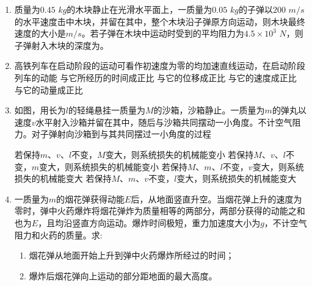\begin{enumerate}[leftmargin=0em]
{}




\item 
{}
质量为$ 0.45 $ $ kg $的木块静止在光滑水平面上，一质量为$ 0.05 $ $ kg $的子弹以$ 200 $ $ m/s $的水平速度击中木块，并留在其中，整个木块沿子弹原方向运动，则木块最终速度的大小是$ m/s $。若子弹在木块中运动时受到的平均阻力为$ 4.5 \times 10^3 $ $ N $，则子弹射入木块的深度为。

\item 
{}
高铁列车在启动阶段的运动可看作初速度为零的均加速直线运动，在启动阶段列车的动能  
\fourchoices
{与它所经历的时间成正比}
{与它的位移成正比}
{与它的速度成正比 }
{与它的动量成正比}

\newpage
\item
{}
如图，用长为$ l $的轻绳悬挂一质量为$ M $的沙箱，沙箱静止。一质量为$ m $的弹丸以速度$ v $水平射入沙箱并留在其中，随后与沙箱共同摆动一小角度。不计空气阻力。对子弹射向沙箱到与其共同摆过一小角度的过程  
\begin{figure}[h!]
\centering

\end{figure}

\fourchoices
{若保持$ m $、$ v $、$ l $不变，$ M $变大，则系统损失的机械能变小}
{若保持$ M $、$ v $、$ l $不变，$ m $变大，则系统损失的机械能变小}
{若保持$ M $、$ m $、$ l $不变，$ v $变大，则系统损失的机械能变大}
{若保持$ M $、$ m $、$ v $不变，$ l $变大，则系统损失的机械能变大}



\item
{}
一质量为$ m $的烟花弹获得动能$ E $后，从地面竖直升空。当烟花弹上升的速度为零时，弹中火药爆炸将烟花弹炸为质量相等的两部分，两部分获得的动能之和也为$ E $，且均沿竖直方向运动。爆炸时间极短，重力加速度大小为$ g $，不计空气阻力和火药的质量。求:
\begin{enumerate}
\renewcommand{\labelenumi}{\arabic{enumi}.}
\item
烟花弹从地面开始上升到弹中火药爆炸所经过的时间；
\item 
爆炸后烟花弹向上运动的部分距地面的最大高度。

\end{enumerate}



\end{enumerate}
